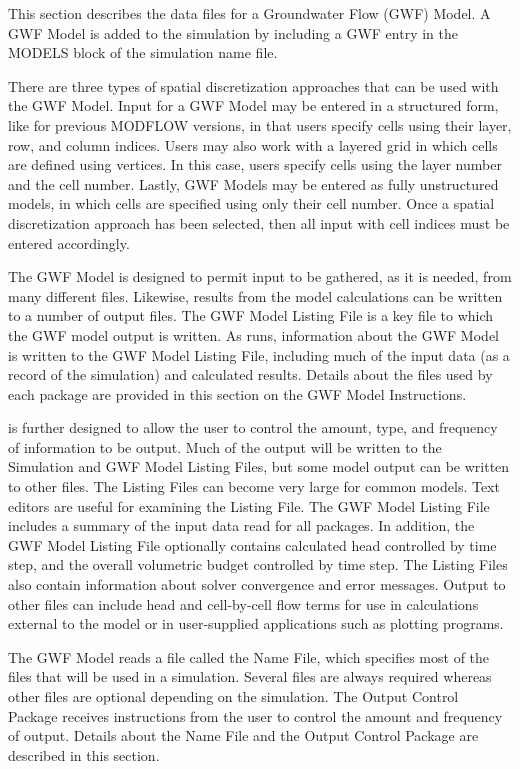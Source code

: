 This section describes the data files for a \mf Groundwater Flow (GWF) Model.  A GWF Model is added to the simulation by including a GWF entry in the MODELS block of the simulation name file.

There are three types of spatial discretization approaches that can be used with the GWF Model.  Input for a GWF Model may be entered in a structured form, like for previous MODFLOW versions, in that users specify cells using their layer, row, and column indices.  Users may also work with a layered grid in which cells are defined using vertices.  In this case, users specify cells using the layer number and the cell number.  Lastly, GWF Models may be entered as fully unstructured models, in which cells are specified using only their cell number.  Once a spatial discretization approach has been selected, then all input with cell indices must be entered accordingly.

The GWF Model is designed to permit input to be gathered, as it is needed, from many different files.  Likewise, results from the model calculations can be written to a number of output files. The GWF Model Listing File is a key file to which the GWF model output is written.  As \mf runs, information about the GWF Model is written to the GWF Model Listing File, including much of the input data (as a record of the simulation) and calculated results.  Details about the files used by each package are provided in this section on the GWF Model Instructions.

\mf is further designed to allow the user to control the amount, type, and frequency of information to be output. Much of the output will be written to the Simulation and GWF Model Listing Files, but some model output can be written to other files.  The Listing Files can become very large for common models.  Text editors are useful for examining the Listing File. The GWF Model Listing File includes a summary of the input data read for all packages.  In addition, the GWF Model Listing File optionally contains calculated head controlled by time step, and the overall volumetric budget controlled by time step. The Listing Files also contain information about solver convergence and error messages.  Output to other files can include head and cell-by-cell flow terms for use in calculations external to the model or in user-supplied applications such as plotting programs.

The GWF Model reads a file called the Name File, which specifies most of the files that will be used in a simulation. Several files are always required whereas other files are optional depending on the simulation. The Output Control Package receives instructions from the user to control the amount and frequency of output.  Details about the Name File and the Output Control Package are described in this section.

